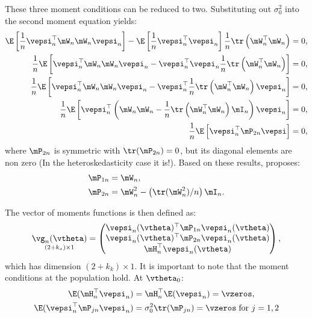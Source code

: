 These three moment conditions can be reduced to two. Substituting out $\sigma^2_0$ into the second moment equation yields:
\begin{equation*}
  \begin{aligned}
    \E\left[\frac{1}{n}\vepsi^\top_n\mW_n\mW_n\vepsi_n\right] - \E\left[\frac{1}{n}\vepsi^\top_n \vepsi_n\right] \frac{1}{n}\tr\left(\mW^\top_n\mW_n\right) & = 0, \\
    \frac{1}{n}\E\left[\vepsi^\top_n\mW_n\mW_n\vepsi_n - \vepsi^\top_n \vepsi_n\frac{1}{n}\tr\left(\mW^\top_n\mW_n\right)\right] & = 0, \\
     \frac{1}{n}\E\left[\vepsi^\top_n\mW_n\mW_n\vepsi_n - \vepsi^\top_n \frac{1}{n}\tr\left(\mW^\top_n\mW_n\right)\vepsi_n\right] & = 0,\\
     \frac{1}{n}\E\left[\vepsi^\top_n\left(\mW_n\mW_n - \frac{1}{n}\tr\left(\mW^\top_n\mW_n\right)\mI_n\right)\vepsi_n\right] & = 0, \\
     \frac{1}{n}\E\left[\vepsi^\top_n\mP_{2n}\vepsi\right] & = 0, 
  \end{aligned}
\end{equation*}
%
where $\mP_{2n}$ is symmetric with $\tr(\mP_{2n}) = 0$, but its diagonal elements are non zero (In the heteroskedasticity case it is!). Based on these results, \cite{lee2007gmm} proposes:
\begin{align*}
\mP_{1n} & = \mW_n, \\
\mP_{2n} & = \mW^2_n - \left(\tr(\mW^2_n)/n\right)\mI_n.
\end{align*}

The vector of moments functions is then defined as:
\begin{equation}\label{eq:moments-lee-2007}
\underset{(2 + k_x)\times 1}{\vg_n(\vtheta)} = \begin{pmatrix}
\vepsi_n(\vtheta)^\top\mP_{1n}\vepsi_n(\vtheta) \\
\vepsi_n(\vtheta)^\top\mP_{2n}\vepsi_n(\vtheta) \\
\mH_n^\top\vepsi_n(\vtheta)
\end{pmatrix},
\end{equation}
%
which has dimension $(2 + k_k) \times 1$. It is important to note that the moment conditions at the population hold. At $\vtheta_0$:
\begin{equation*}
\begin{aligned}
\E(\mH_n^\top\vepsi_n) & = \mH_n^\top\E(\vepsi_n) = \vzeros,  \\
\E(\vepsi_n^\top \mP_{jn}\vepsi_n) & = \sigma_0^2\tr(\mP_{jn}) = \vzeros\;\mbox{for $j = 1,2$}
\end{aligned}
\end{equation*}

